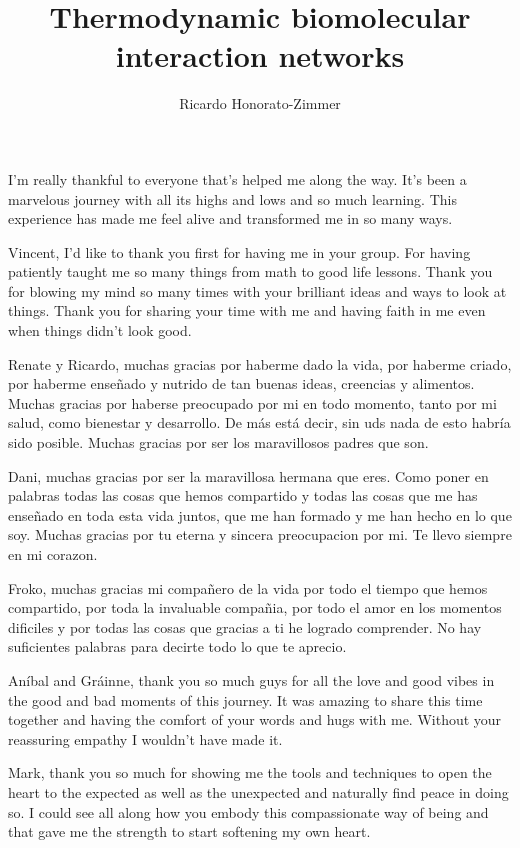 \documentclass[phd,lfcs]{infthesis}
\title{Thermodynamic biomolecular interaction networks} %
\author{Ricardo Honorato-Zimmer}
\begin{document}
\begin{preliminary}

\maketitle

\begin{acknowledgements}
  I'm really thankful to everyone that's helped me along the way.
  It's been a marvelous journey with all its highs and lows
  and so much learning.
  This experience has made me feel alive and transformed me
  in so many ways.

  Vincent, I'd like to thank you first for having me in your group.
  For having patiently taught me so many things
  from math to good life lessons.
  Thank you for blowing my mind so many times
  with your brilliant ideas and ways to look at things.
  Thank you for sharing your time with me
  and having faith in me even when things didn't look good.

  Renate y Ricardo, muchas gracias por haberme dado la vida,
  por haberme criado, por haberme enseñado y nutrido
  de tan buenas ideas, creencias y alimentos.
  Muchas gracias por haberse preocupado por mi en todo momento,
  tanto por mi salud, como bienestar y desarrollo.
  De m\'as est\'a decir, sin uds nada de esto habr\'ia sido posible.
  Muchas gracias por ser los maravillosos padres que son.

  Dani, muchas gracias por ser la maravillosa hermana que eres.
  Como poner en palabras todas las cosas que hemos compartido
  y todas las cosas que me has enseñado en toda esta vida juntos,
  que me han formado y me han hecho en lo que soy.
  Muchas gracias por tu eterna y sincera preocupacion por mi.
  Te llevo siempre en mi corazon.

  Froko, muchas gracias mi compañero de la vida
  por todo el tiempo que hemos compartido,
  por toda la invaluable compañia,
  por todo el amor en los momentos dificiles
  y por todas las cosas que gracias a ti he logrado comprender.
  No hay suficientes palabras para decirte todo lo que te aprecio.

  An\'ibal and Gr\'ainne, thank you so much guys for all the love
  and good vibes in the good and bad moments of this journey.
  It was amazing to share this time together
  and having the comfort of your words and hugs with me.
  Without your reassuring empathy I wouldn't have made it.

  Mark, thank you so much
  for showing me the tools and techniques to open the heart
  to the expected as well as the unexpected
  and naturally find peace in doing so.
  I could see all along how you embody this compassionate way of being
  and that gave me the strength to start softening my own heart.


\end{acknowledgements}
\end{preliminary}
\end{document}
